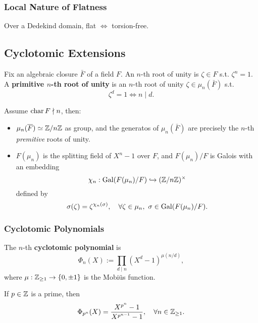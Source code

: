 \subsubsection{Local Nature of Flatness}

\begin{corollary}
    Over a Dedekind domain, flat $\iff$ torsion-free.
\end{corollary}



\subsection{Cyclotomic Extensions}

Fix an algebraic closure $\bar{F}$ of a field $F$.
An $n$-th root of unity is $\zeta\in F$ s.t. $\zeta^n = 1$.
A \textbf{primitive $n$-th root of unity} is an $n$-th root of unity $\zeta\in\mu_n(\bar{F})$ s.t. \[\zeta^d = 1\iff n\mid d.\]
\begin{proposition}\label{basic property of mu-n when char not divide n}
    Assume $\operatorname{char} F\nmid n$, then:
\begin{itemize}
    \item $\mu_n(\overline{F})\simeq \mathbb{Z}/n\mathbb{Z}$ as group, and the generatos of $\mu_n(\bar{F})$ are precisely the $n$-th \textit{premitive} roots of unity.
    \item $F(\mu_n)$ is the splitting field of $X^n - 1$ over $F$, and $F(\mu_n)/F$ is Galois with an embedding \[\chi_n : \operatorname{Gal}(F(\mu_n)/F)\hookrightarrow (\mathbb{Z}/n\mathbb{Z})^\times\]
    defined by \[\sigma(\zeta) = \zeta^{\chi_n(\sigma)},\quad \forall \zeta\in \mu_n,\ \sigma\in\gal(F(\mu_n)/F).\]
\end{itemize}
\end{proposition}

\subsubsection*{Cyclotomic Polynomials}

\begin{definition}
    The $n$-th \textbf{cyclotomic polynomial} is \[\Phi_n(X) := \prod_{d\mid n}\left( X^d - 1 \right)^{\mu(n/d)},\]where $\mu : \mathbb{Z}_{\ge 1}\to \{0, \pm 1\}$ is the Mobi\"us function.
\end{definition}

\begin{example}
    If $p\in\mathbb{Z}$ is a prime,
    then \[\Phi_{p^n}(X) = \frac{X^{p^n} - 1}{X^{p^{n-1}} - 1},\quad\forall n\in\mathbb{Z}_{\ge 1}.\]
\end{example}


